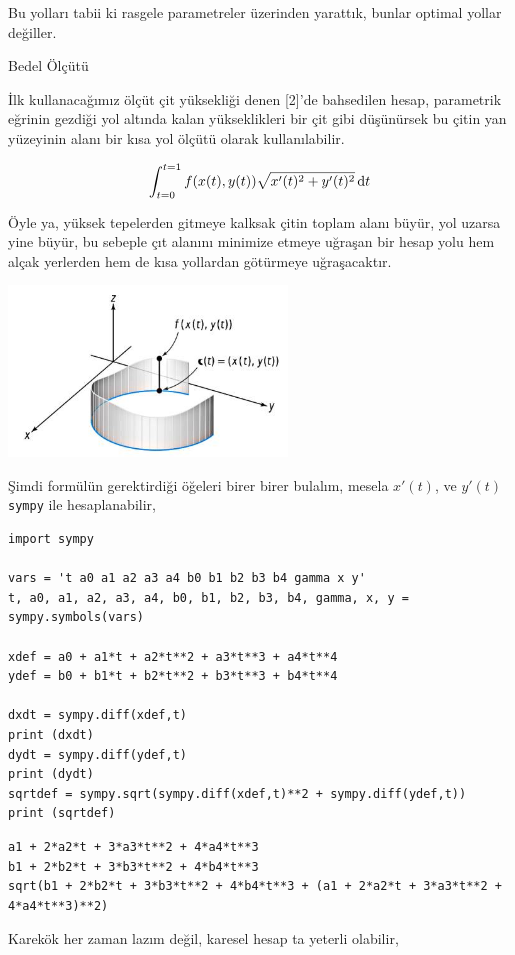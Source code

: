 \documentclass[12pt,fleqn]{article}\usepackage{../../common}
\begin{document}
Bu yolları tabii ki rasgele parametreler üzerinden yarattık, bunlar optimal
yollar değiller.

Bedel Ölçütü

İlk kullanacağımız ölçüt çit yüksekliği denen [2]'de bahsedilen hesap,
parametrik eğrinin gezdiği yol altında kalan yükseklikleri bir çit gibi
düşünürsek bu çitin yan yüzeyinin alanı bir kısa yol ölçütü olarak
kullanılabilir. 

$$
\int_{t=0}^{t=1} f(x(t),y(t)) \sqrt {x'(t)^2 + y'(t)^2} \,\mathrm{d} t
$$

Öyle ya, yüksek tepelerden gitmeye kalksak çitin toplam alanı büyür, yol uzarsa
yine büyür, bu sebeple çıt alanını minimize etmeye uğraşan bir hesap yolu hem
alçak yerlerden hem de kısa yollardan götürmeye uğraşacaktır.

\includegraphics[width=20em]{../../calc_multi/calc_multi_06/calc_multi_06_04.jpg}

Şimdi formülün gerektirdiği öğeleri birer birer bulalım, mesela $x'(t)$, ve
$y'(t)$ \verb!sympy! ile hesaplanabilir,

\begin{verbatim}
import sympy

vars = 't a0 a1 a2 a3 a4 b0 b1 b2 b3 b4 gamma x y'
t, a0, a1, a2, a3, a4, b0, b1, b2, b3, b4, gamma, x, y = sympy.symbols(vars)

xdef = a0 + a1*t + a2*t**2 + a3*t**3 + a4*t**4
ydef = b0 + b1*t + b2*t**2 + b3*t**3 + b4*t**4

dxdt = sympy.diff(xdef,t)
print (dxdt)
dydt = sympy.diff(ydef,t)
print (dydt)
sqrtdef = sympy.sqrt(sympy.diff(xdef,t)**2 + sympy.diff(ydef,t))
print (sqrtdef)
\end{verbatim}

\begin{verbatim}
a1 + 2*a2*t + 3*a3*t**2 + 4*a4*t**3
b1 + 2*b2*t + 3*b3*t**2 + 4*b4*t**3
sqrt(b1 + 2*b2*t + 3*b3*t**2 + 4*b4*t**3 + (a1 + 2*a2*t + 3*a3*t**2 + 4*a4*t**3)**2)
\end{verbatim}

Karekök her zaman lazım değil, karesel hesap ta yeterli olabilir,
\end{document}
